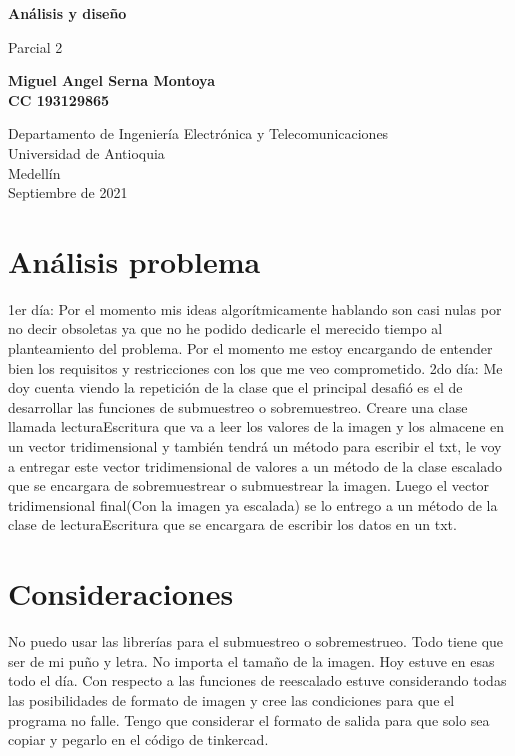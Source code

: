 \documentclass{article}
\begin{document}
\begin{titlepage}
    \begin{center}
        \vspace*{1cm}
            
        \Huge
        \textbf{Análisis y diseño}
            
        \vspace{0.5cm}
        \LARGE
        Parcial 2
            
        \vspace{1.5cm}
        \textbf{Miguel Angel Serna Montoya\\CC 193129865}
        
            
        \vfill
            
        \vspace{0.8cm}
            
        \Large
        Departamento de Ingeniería Electrónica y Telecomunicaciones\\
        Universidad de Antioquia\\
        Medellín\\
        Septiembre de 2021
            
    \end{center}
\end{titlepage}

\tableofcontents

\section{Análisis problema} \label{contenido}
1er día: Por el momento mis ideas algorítmicamente hablando son casi nulas por no decir obsoletas ya que no he podido dedicarle el merecido tiempo al planteamiento del problema. Por el momento me estoy encargando de entender bien los requisitos y restricciones con los que me veo comprometido.
2do día: Me doy cuenta viendo la repetición de la clase que el principal desafió es el de desarrollar las funciones de submuestreo o sobremuestreo. Creare una clase llamada lecturaEscritura que va a leer los valores de la imagen y los almacene en un vector tridimensional y también tendrá un método para escribir el txt, le voy a entregar este vector tridimensional de valores a un método de la clase escalado que se encargara de sobremuestrear o submuestrear la imagen. Luego el vector tridimensional final(Con la imagen ya escalada) se lo entrego a un método de  la clase de lecturaEscritura que se encargara de escribir los datos en un txt.
\section{Consideraciones}
No puedo usar las librerías para el submuestreo o sobremestrueo. Todo tiene que ser de mi puño y letra.
No importa el tamaño de la imagen. Hoy estuve en esas todo el día.
Con respecto a las funciones de reescalado estuve considerando todas las posibilidades de formato de imagen y cree las condiciones para que el programa no falle.
Tengo que considerar el formato de salida para que solo sea copiar y pegarlo en el código de tinkercad.
\newpage
\end{document}
